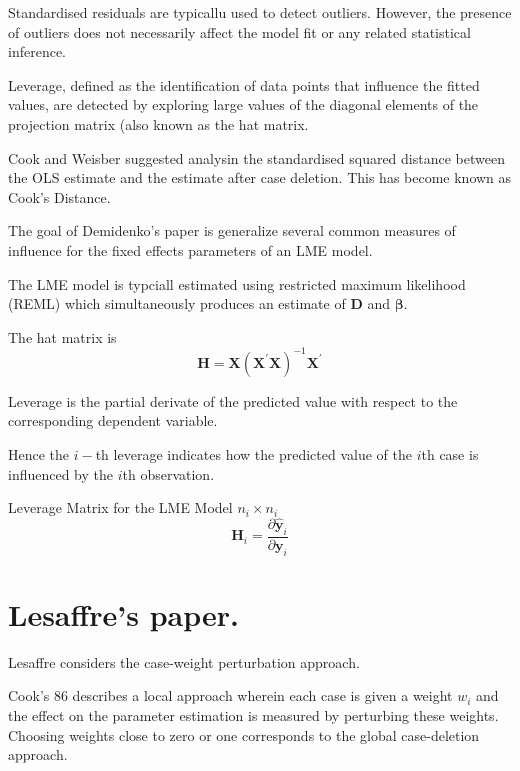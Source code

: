 \documentclass[MAIN.tex]{subfiles}
\begin{document}

Standardised residuals are typicallu used to detect outliers. However, the presence of outliers does not necessarily affect the model fit or any related statistical inference.

Leverage, defined as the identification of data points that influence the fitted values, are detected by exploring large values of the diagonal elements of the projection matrix (also known as the hat matrix.

Cook and Weisber suggested analysin the standardised squared distance between the OLS estimate and the estimate after case deletion. This has become known as Cook's Distance.

The goal of Demidenko's paper is generalize several common measures of influence for the fixed effects parameters of an LME model.



The LME model is typciall estimated using restricted maximum likelihood (REML) which simultaneously produces an estimate of $\boldsymbol{D}$ and $\boldsymbol{\beta}$.

The hat matrix is 
\[\boldsymbol{H}  =  \boldsymbol{X} (\boldsymbol{X}^{\prime}\boldsymbol{X})^{-1}\boldsymbol{X} ^{\prime} \]

Leverage is the partial derivate of  the predicted value with respect to the corresponding dependent variable.

Hence the $i-$th leverage indicates how the predicted value of the $i$th case is influenced by the $i$th observation.


Leverage Matrix  for the LME Model $n_i \times n_i$
\[ \boldsymbol{H}_i = \frac{ \partial \hat{\boldsymbol{y}}_i } {\partial \boldsymbol{y}_i } \]

\section{Lesaffre's paper.} %

Lesaffre considers the case-weight perturbation approach.


Cook's 86 describes a local approach wherein each case is given a
weight $w_{i}$ and the effect on the parameter estimation is
measured by perturbing these weights. Choosing weights close to
zero or one corresponds to the global case-deletion approach.
\end{document}

